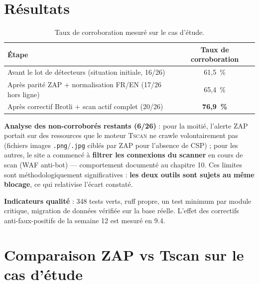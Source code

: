 \documentclass[11pt,a4paper]{report}
\newcommand{\tscan}{\textsc{Tscan}}
\newcommand{\code}[1]{\texttt{#1}}
\begin{document}
\section{Résultats}

\begin{table}[h!]
\centering
\begin{tabular}{@{}lc@{}}
\toprule
\textbf{Étape} & \textbf{Taux de corroboration} \\
\midrule
Avant le lot de détecteurs (situation initiale, 16/26) & 61,5~\% \\
Après parité ZAP + normalisation FR/EN (17/26 hors ligne) & 65,4~\% \\
Après correctif Brotli + scan actif complet (20/26) & \textbf{76,9~\%} \\
\bottomrule
\end{tabular}
\caption{Taux de corroboration mesuré sur le cas d'étude.}
\end{table}

\textbf{Analyse des non-corroborés restants (6/26)} : pour la moitié, l'alerte ZAP portait
sur des ressources que le moteur \tscan{} ne crawle volontairement pas (fichiers images
\code{.png}/\code{.jpg} ciblés par ZAP pour l'absence de CSP) ; pour les autres, le site a
commencé à \textbf{filtrer les connexions du scanner} en cours de scan (WAF anti-bot) ---
comportement documenté au chapitre 10. Ces limites sont méthodologiquement significatives :
\textbf{les deux outils sont sujets au même blocage}, ce qui relativise l'écart constaté.

\textbf{Indicateurs qualité} : 348 tests verts, ruff propre, un test minimum par module
critique, migration de données vérifiée sur la base réelle. L'effet des correctifs
anti-faux-positifs de la semaine 12 est mesuré en 9.4.

\section{Comparaison ZAP vs Tscan sur le cas d'étude}
\end{document}
